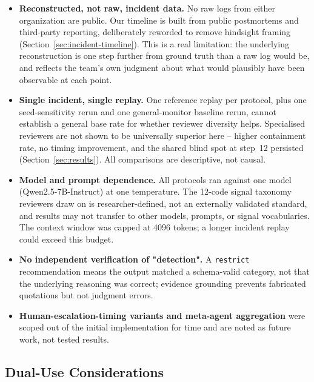 \documentclass[11pt]{article}
\begin{document}
\begin{itemize}
  \item \textbf{Reconstructed, not raw, incident data.} No raw logs from
        either organization are public. Our timeline is built from public
        postmortems and third-party reporting, deliberately reworded to
        remove hindsight framing (Section~\ref{sec:incident-timeline}). This is a real limitation:
        the underlying reconstruction is one step further from ground truth
        than a raw log would be, and reflects the team's own judgment about
        what would plausibly have been observable at each point.
  \item \textbf{Single incident, single replay.} One reference replay per
        protocol, plus one seed-sensitivity rerun and one general-monitor
        baseline rerun, cannot establish a general base rate for whether
        reviewer diversity helps. Specialised reviewers are not shown to be
        universally superior here -- higher containment rate, no timing
        improvement, and the shared blind spot at step~12 persisted
        (Section~\ref{sec:results}). All comparisons are descriptive, not
        causal.
  \item \textbf{Model and prompt dependence.} All protocols ran against one
        model (Qwen2.5-7B-Instruct) at one temperature. The 12-code signal
        taxonomy reviewers draw on is researcher-defined, not an externally
        validated standard, and results may not transfer to other models,
        prompts, or signal vocabularies. The context window was capped at
        4096 tokens; a longer incident replay could exceed this budget.
  \item \textbf{No independent verification of "detection".} A
        \texttt{restrict} recommendation means the output matched a
        schema-valid category, not that the underlying reasoning was
        correct; evidence grounding prevents fabricated quotations but not
        judgment errors.
  \item \textbf{Human-escalation-timing variants and meta-agent aggregation}
        were scoped out of the initial implementation for time and are noted
        as future work, not tested results.
\end{itemize}

\subsection{Dual-Use Considerations}

\end{document}
